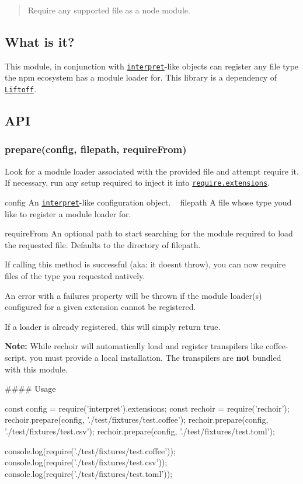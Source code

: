 \begin{quote}
Require any supported file as a node module. \end{quote}


\href{https://nodei.co/npm/rechoir/}{\tt }

\subsection*{What is it?}

This module, in conjunction with \href{http://github.com/tkellen/js-interpret}{\tt interpret}-\/like objects can register any file type the npm ecosystem has a module loader for. This library is a dependency of \href{http://github.com/tkellen/js-liftoff}{\tt Liftoff}.

\subsection*{A\+PI}

\subsubsection*{prepare(config, filepath, require\+From)}

Look for a module loader associated with the provided file and attempt require it. If necessary, run any setup required to inject it into \href{http://nodejs.org/api/globals.html#globals_require_extensions}{\tt require.\+extensions}.

{\ttfamily config} An \href{http://github.com/tkellen/js-interpret}{\tt interpret}-\/like configuration object. ~\newline
 {\ttfamily filepath} A file whose type you\textquotesingle{}d like to register a module loader for.

{\ttfamily require\+From} An optional path to start searching for the module required to load the requested file. Defaults to the directory of {\ttfamily filepath}.

If calling this method is successful (aka\+: it doesn\textquotesingle{}t throw), you can now require files of the type you requested natively.

An error with a {\ttfamily failures} property will be thrown if the module loader(s) configured for a given extension cannot be registered.

If a loader is already registered, this will simply return {\ttfamily true}.

{\bfseries Note\+:} While rechoir will automatically load and register transpilers like {\ttfamily coffee-\/script}, you must provide a local installation. The transpilers are {\bfseries not} bundled with this module.

\#\#\#\# Usage 
\begin{DoxyCode}
const config = require('interpret').extensions;
const rechoir = require('rechoir');
rechoir.prepare(config, './test/fixtures/test.coffee');
rechoir.prepare(config, './test/fixtures/test.csv');
rechoir.prepare(config, './test/fixtures/test.toml');

console.log(require('./test/fixtures/test.coffee'));
console.log(require('./test/fixtures/test.csv'));
console.log(require('./test/fixtures/test.toml'));
\end{DoxyCode}
 